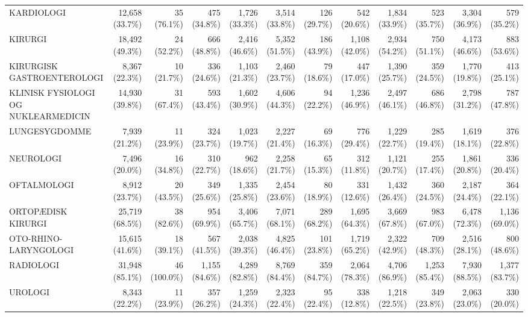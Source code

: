 \begin{table}
{\begin{tabular}{@{}lrrrrrrrrrrr@{}}
\quad KARDIOLOGI & 12,658 (33.7\%) & 35 (76.1\%) & 475 (34.8\%) & 1,726 (33.3\%) & 3,514 (33.8\%) & 126 (29.7\%) & 542 (20.6\%) & 1,834 (33.9\%) & 523 (35.7\%) & 3,304 (36.9\%) & 579 (35.2\%) \\
\quad KIRURGI & 18,492 (49.3\%) & 24 (52.2\%) & 666 (48.8\%) & 2,416 (46.6\%) & 5,352 (51.5\%) & 186 (43.9\%) & 1,108 (42.0\%) & 2,934 (54.2\%) & 750 (51.1\%) & 4,173 (46.6\%) & 883 (53.6\%) \\
\quad KIRURGISK GASTROENTEROLOGI & 8,367 (22.3\%) & 10 (21.7\%) & 336 (24.6\%) & 1,103 (21.3\%) & 2,460 (23.7\%) & 79 (18.6\%) & 447 (17.0\%) & 1,390 (25.7\%) & 359 (24.5\%) & 1,770 (19.8\%) & 413 (25.1\%) \\
\quad KLINISK FYSIOLOGI OG NUKLEARMEDICIN & 14,930 (39.8\%) & 31 (67.4\%) & 593 (43.4\%) & 1,602 (30.9\%) & 4,606 (44.3\%) & 94 (22.2\%) & 1,236 (46.9\%) & 2,497 (46.1\%) & 686 (46.8\%) & 2,798 (31.2\%) & 787 (47.8\%) \\
\quad LUNGESYGDOMME & 7,939 (21.2\%) & 11 (23.9\%) & 324 (23.7\%) & 1,023 (19.7\%) & 2,227 (21.4\%) & 69 (16.3\%) & 776 (29.4\%) & 1,229 (22.7\%) & 285 (19.4\%) & 1,619 (18.1\%) & 376 (22.8\%) \\
\quad NEUROLOGI & 7,496 (20.0\%) & 16 (34.8\%) & 310 (22.7\%) & 962 (18.6\%) & 2,258 (21.7\%) & 65 (15.3\%) & 312 (11.8\%) & 1,121 (20.7\%) & 255 (17.4\%) & 1,861 (20.8\%) & 336 (20.4\%) \\
\quad OFTALMOLOGI & 8,912 (23.7\%) & 20 (43.5\%) & 349 (25.6\%) & 1,335 (25.8\%) & 2,454 (23.6\%) & 80 (18.9\%) & 331 (12.6\%) & 1,432 (26.4\%) & 360 (24.5\%) & 2,187 (24.4\%) & 364 (22.1\%) \\
\quad ORTOPÆDISK KIRURGI & 25,719 (68.5\%) & 38 (82.6\%) & 954 (69.9\%) & 3,406 (65.7\%) & 7,071 (68.1\%) & 289 (68.2\%) & 1,695 (64.3\%) & 3,669 (67.8\%) & 983 (67.0\%) & 6,478 (72.3\%) & 1,136 (69.0\%) \\
\quad OTO-RHINO-LARYNGOLOGI & 15,615 (41.6\%) & 18 (39.1\%) & 567 (41.5\%) & 2,038 (39.3\%) & 4,825 (46.4\%) & 101 (23.8\%) & 1,719 (65.2\%) & 2,322 (42.9\%) & 709 (48.3\%) & 2,516 (28.1\%) & 800 (48.6\%) \\
\quad RADIOLOGI & 31,948 (85.1\%) & 46 (100.0\%) & 1,155 (84.6\%) & 4,289 (82.8\%) & 8,769 (84.4\%) & 359 (84.7\%) & 2,064 (78.3\%) & 4,706 (86.9\%) & 1,253 (85.4\%) & 7,930 (88.5\%) & 1,377 (83.7\%) \\
\quad UROLOGI & 8,343 (22.2\%) & 11 (23.9\%) & 357 (26.2\%) & 1,259 (24.3\%) & 2,323 (22.4\%) & 95 (22.4\%) & 338 (12.8\%) & 1,218 (22.5\%) & 349 (23.8\%) & 2,063 (23.0\%) & 330 (20.0\%) \\

\end{tabular}}
\end{table}
